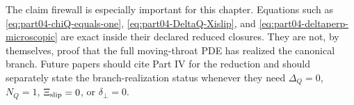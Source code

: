 The claim firewall is especially important for this chapter.  Equations such as \eqref{eq:part04-chiQ-equals-one}, \eqref{eq:part04-DeltaQ-Xislip}, and \eqref{eq:part04-deltaperp-microscopic} are exact inside their declared reduced closures.  They are not, by themselves, proof that the full moving-throat PDE has realized the canonical branch.  Future papers should cite Part IV for the reduction and should separately state the branch-realization status whenever they need \(\Delta_Q=0\), \(N_Q=1\), \(\Xi_{\rm slip}=0\), or \(\delta_\perp=0\).
